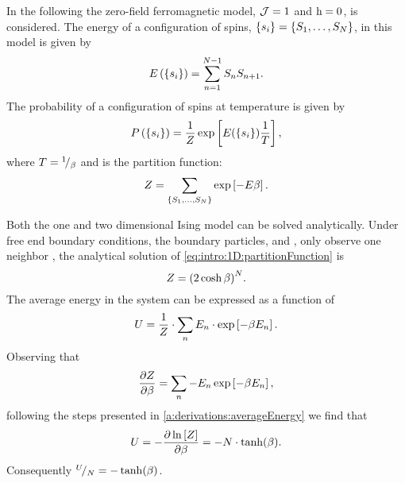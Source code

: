 	In the following the zero-field ferromagnetic model, \ie \mbox{$\mathcal{J} = 1$} and \mbox{$\mathrm{h} = 0$},  is considered. The energy \energy of a configuration of spins, \mbox{$\left\{s_{i}\right\} = \left\{S_{1}, \dotsc, S_{N} \right\}$}, in this model is given by 
	\begin{equation}
		E\left(\left\{s_{i}\right\}\right) = \sum_{n = 1}^{N - 1}S_{n}S_{n+1}.
	\end{equation}
	The probability of a configuration of spins  at temperature \temperature is given by
	\begin{equation}
		\label{eq:intro:1D:configurationProbability}
		P\left(\left\{s_{i}\right\}\right) = 
		\frac{1}{Z} \exp\left[{E(\left\{s_{i}\right\})}\frac{1}{T}\right],
	\end{equation}
	where $T = {}^{1}\!/_{\beta}$ and \partitionfunction is the partition function:
	\begin{equation}
		\label{eq:intro:1D:partitionFunction}
		Z = \sum_{\left\{S_{1}, \dotsc, S_{N} \right\}} \exp\left[- E \beta \right].
	\end{equation}

	Both the one and two dimensional Ising model can be solved analytically. Under free end boundary conditions, \ie the boundary particles,  and , only observe one neighbor \cite{landau2014guide}, the analytical solution of \cref{eq:intro:1D:partitionFunction} is
	\begin{equation}
		\label{eq:introduced1D:partitionFunctionAnalyticalSolution}
		Z = {(2 \cosh \beta)}^N.
	\end{equation}
	The average energy in the system can be expressed as a function of \partitionfunction \cite{Murray20011Handout}
	\begin{equation}
		\label{eq:intro:1D:averageEnergyOriginal}
		U = \frac{1}{Z} \cdot \sum_{n} E_n \cdot \exp\left[-\beta E_n \right].		
	\end{equation} 
	Observing that
	\begin{equation}
		\frac{\partial Z}{\partial \beta} = \sum_{n} - E_n \exp\left[-\beta E_n \right],
	\end{equation}
	following the steps presented in \cref{a:derivations:averageEnergy} we find that
	\begin{equation}
		U = - \frac{\partial \ln \left[ Z \right]}{\partial \beta} = - N \cdot \tanh (\beta).
	\end{equation}
	Consequently ${}^{U}\!/_{N} = - \tanh (\beta)$.

